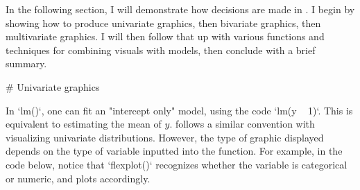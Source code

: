 In the following section, I will demonstrate how decisions are made in . I begin by showing how to produce univariate graphics, then bivariate graphics, then multivariate graphics. I will then follow that up with various functions and techniques for combining visuals with models, then conclude with a brief summary. 

# Univariate graphics

In `lm()`, one can fit an "intercept only" model, using the code `lm(y ~ 1)`. This is equivalent to estimating the mean of $y$.  follows a similar convention with visualizing univariate distributions. However, the type of graphic displayed depends on the type of variable inputted into the function. For example, in the code below, notice that `flexplot()` recognizes whether the variable is categorical or numeric, and plots accordingly. 


